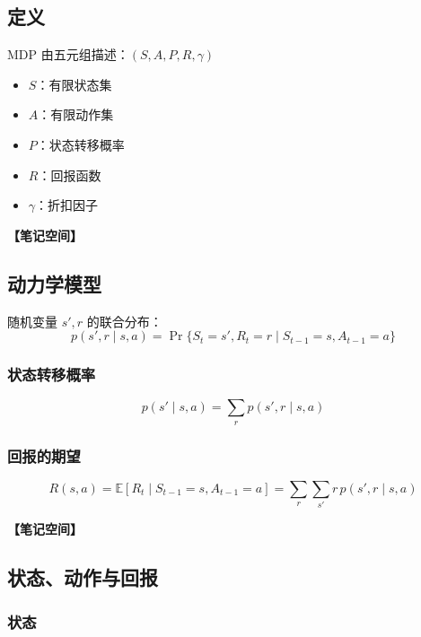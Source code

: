 \documentclass[12pt,a4paper]{article}
\newcommand{\notespace}[1][3cm]{%
  \vspace{#1}%
  \noindent\textbf{【笔记空间】}%
  \vspace{#1}%
}
\newcommand{\E}{\mathbb{E}}
\newcommand{\1}{\mathbf{1}}
\begin{document}
\subsection{定义}

\begin{keybox}
MDP 由五元组描述：$(S,A,P,R,\gamma)$
\begin{itemize}[leftmargin=1.5em]
  \item $S$：有限状态集
  \item $A$：有限动作集
  \item $P$：状态转移概率
  \item $R$：回报函数
  \item $\gamma$：折扣因子
\end{itemize}
\end{keybox}

\notespace[2cm]

\subsection{动力学模型}

随机变量 $s',r$ 的联合分布：
\begin{equation}
p(s',r\mid s,a)=\Pr\{S_t=s',R_t=r\mid S_{t-1}=s,A_{t-1}=a\}
\end{equation}

\subsubsection*{状态转移概率}

\begin{equation}
p(s'\mid s,a)=\sum_r p(s',r\mid s,a)
\end{equation}

\subsubsection*{回报的期望}

\begin{equation}
R(s,a)=\E[R_t\mid S_{t-1}=s,A_{t-1}=a] =\sum_r \sum_{s'} r\, p(s',r\mid s,a)
\end{equation}

\notespace[2cm]

\subsection{状态、动作与回报}

\subsubsection*{状态}
\end{document}
